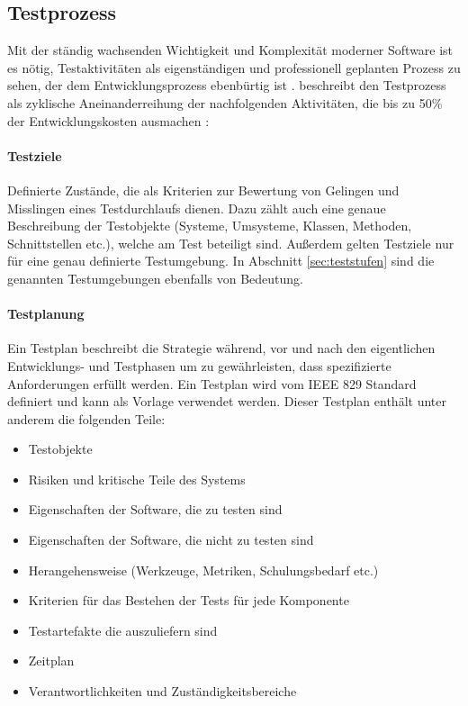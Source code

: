 \subsection{Testprozess}
Mit der ständig wachsenden Wichtigkeit und Komplexität moderner Software ist es nötig, Testaktivitäten als eigenständigen und professionell geplanten Prozess zu sehen, der dem Entwicklungsprozess ebenbürtig ist \cite{grechenig_softwaretechnik:_2010}. \citeauthor{grechenig_softwaretechnik:_2010} beschreibt den Testprozess als zyklische Aneinanderreihung der nachfolgenden Aktivitäten, die bis zu 50\% der Entwicklungskosten ausmachen \citeauthor{grechenig_softwaretechnik:_2010}:

\paragraph{Testziele} Definierte Zustände, die als Kriterien zur Bewertung von Gelingen und Misslingen eines Testdurchlaufs dienen. Dazu zählt auch eine genaue Beschreibung der Testobjekte (Systeme, Umsysteme, Klassen, Methoden, Schnittstellen etc.), welche am Test beteiligt sind. Außerdem gelten Testziele nur für eine genau definierte Testumgebung. In Abschnitt \ref{sec:teststufen}  sind die genannten Testumgebungen ebenfalls von Bedeutung.

\paragraph{Testplanung} Ein Testplan beschreibt die Strategie während, vor und nach den eigentlichen Entwicklungs- und Testphasen um zu gewährleisten, dass spezifizierte Anforderungen erfüllt werden. Ein Testplan wird vom IEEE 829 \cite{_ieee_2008} Standard definiert und kann als Vorlage verwendet werden. Dieser Testplan enthält unter anderem die folgenden Teile:

\begin{itemize}
\item Testobjekte
\item Risiken und kritische Teile des Systems
\item Eigenschaften der Software, die zu testen sind
\item Eigenschaften der Software, die nicht zu testen sind
\item Herangehensweise (Werkzeuge, Metriken, Schulungsbedarf etc.)
\item Kriterien für das Bestehen der Tests für jede Komponente
\item Testartefakte die auszuliefern sind
\item Zeitplan
\item Verantwortlichkeiten und Zuständigkeitsbereiche
\end{itemize}

